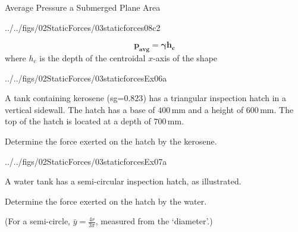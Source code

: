 \documentclass[9pt,xcolor={svgnames, x11names},professionalfonts, mathserif]{beamer}
\begin{document}
\begin{frame}{Average Pressure a Submerged Plane Area}
	\centering
	\begin{cfig}[0.55]{../../figs/02StaticForces/03staticforces08c2}\end{cfig}
	\begin{mybox}[width=10cm, title=Average Pressure on a Submerged Plane Area]
		
		\[\bm{ p_{avg} = \gamma h_c }\]
		\centering
		where $h_c$ is the depth of the centroidal $x$-axis of the shape
		
	\end{mybox}
\end{frame}



\begin{frame}
	\centering
	\begin{mybox}[width=9cm,colframe=example]
		\begin{cfig}[0.55]{../../figs/02StaticForces/03staticforcesEx06a}\end{cfig}
	\end{mybox}
	
	\begin{myexam}[width=10.875cm,colframe=example,colbacktitle=example!80!white]{}{}
		\raggedright
		A tank containing kerosene (sg=$0.823$) has a triangular inspection hatch in a vertical sidewall. The hatch has
		a base of $400\,\text{mm}$ and a height of $600\,\text{mm}$. The top of the hatch is located at a depth of $700\,\text{mm}$.
		\par\smallskip
		Determine the force exerted on the hatch by the kerosene.
	\end{myexam}
	
\end{frame}


\begin{frame}
	\centering
	\begin{mybox}[width=7cm]
		\begin{cfig}[0.25]{../../figs/02StaticForces/03staticforcesEx07a}\end{cfig}
	\end{mybox}
	
	\begin{myexam}[width=10cm]{}{}
		A water tank has a semi-circular inspection hatch, as illustrated.
		\par\smallskip
		Determine the force exerted on the hatch by the water. \par
		\begin{center}
			(For a semi-circle, $\bar{y}=\frac{4r}{3\pi}$, measured from the `diameter'.)
		\end{center}
	\end{myexam}
	
\end{frame}
\end{document}
